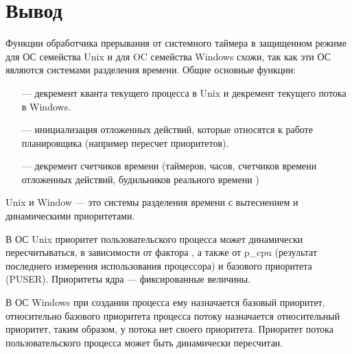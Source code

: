 \chapter*{Вывод}
Функции обработчика прерывания от системного таймера в защищенном режиме для ОС семейства Unix и для OC семейства Windows схожи, так как эти ОС являются системами разделения времени. Общие основные функции:
\begin{itemize}
	\item[---] декремент кванта текущего процесса в Unix и декремент текущего потока в Windows.
	\item[---] инициализация отложенных действий, которые относятся к работе планировщика (например пересчет приоритетов).
	\item[---] декремент счетчиков времени (таймеров, часов, счетчиков времени отложенных действий, будильников реального времени ) 
\end{itemize}

Unix и Window --- это системы разделения времени с вытеснением и динамическими приоритетами.

В ОС Unix приоритет пользовательского процесса может динамически пересчитываться, в зависимости от фактора \guillemotright, а также от {\ttfamily p\_cpu} (результат последнего измерения использования процессора) и базового приоритета ({\ttfamily PUSER}). Приоритеты ядра --- фиксированные величины.

В ОС Windows при создании процесса ему назначается базовый приоритет, относительно базового приоритета процесса потоку назначается относительный приоритет, таким образом, у потока нет своего приоритета. Приоритет потока пользовательского процесса может быть динамически пересчитан.